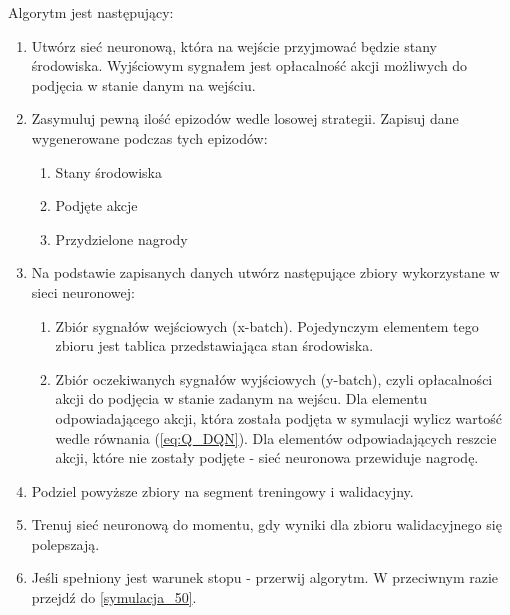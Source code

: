\documentclass[12pt]{book}
\theoremstyle{plain}
\newcommand{\myref}[1]{(\ref{#1})}
\begin{document}
Algorytm jest następujący:
\begin{enumerate}
	\item Utwórz sieć neuronową, która na wejście przyjmować będzie stany środowiska. Wyjściowym sygnałem jest opłacalność akcji możliwych do podjęcia w stanie danym na wejściu.
	\item Zasymuluj pewną ilość epizodów wedle losowej strategii. Zapisuj dane wygenerowane podczas tych epizodów: \label{symulacja_50}
	\begin{enumerate}
		\item Stany środowiska
		\item Podjęte akcje
		\item Przydzielone nagrody
	\end{enumerate}
\item Na podstawie zapisanych danych utwórz następujące zbiory wykorzystane w sieci neuronowej:
	\begin{enumerate}
	\item Zbiór sygnałów wejściowych (x-batch). Pojedynczym elementem tego zbioru jest tablica przedstawiająca stan środowiska.
	\item Zbiór oczekiwanych sygnałów wyjściowych (y-batch), czyli opłacalności akcji do podjęcia w stanie zadanym na wejścu.
	Dla elementu odpowiadającego akcji, która została podjęta w symulacji wylicz wartość wedle równania \myref{eq:Q_DQN}. Dla elementów odpowiadających reszcie akcji, które nie zostały podjęte - sieć neuronowa przewiduje nagrodę. 
	\end{enumerate}
\item Podziel powyższe zbiory na segment treningowy i walidacyjny.
\item Trenuj sieć neuronową do momentu, gdy wyniki dla zbioru walidacyjnego się polepszają.
\item Jeśli spełniony jest warunek stopu - przerwij algorytm. W przeciwnym razie przejdź do \ref{symulacja_50}.
	
\end{enumerate}
\end{document}
